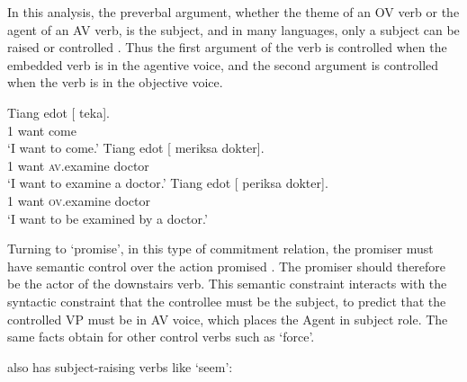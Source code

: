 \documentclass[output=paper
	        ,collection
	        ,collectionchapter
 	        ,biblatex
                ,babelshorthands
                ,newtxmath
                ,draftmode
                ,colorlinks, citecolor=brown
]{langscibook}
\begin{document}
In this analysis, the preverbal argument, whether the theme of an OV verb or the agent of an AV verb, is the subject, and in many languages, only a subject
can be raised or controlled \citep{Zaenenetal1985}. Thus the first argument of the verb is controlled when the embedded verb is in the agentive voice, and the second argument is controlled when the verb is in the objective voice. 


\begin{exe}
\ex \begin{xlist}
\ex 
\gll Tiang edot [ \trace{} teka].\\
     1 want     {} {} come\\\hfill\citep[ex 25]{WechslerandArka1998}
\glt `I want to come.'
\ex 
\gll Tiang edot [ \trace{}  meriksa dokter].\\
     1     want {} {}     \textsc{av}.examine doctor\\
\glt `I want to examine a doctor.'
\ex 
\gll Tiang edot [ \trace{} periksa dokter].\\
     1     want {} {}    \textsc{ov}.examine doctor\\
\glt `I want to be examined by a doctor.'
\end{xlist}
\end{exe}

Turning to  `promise', in this type of commitment relation, the promiser must have semantic control over the action promised \citep{Farkas1988,Kroeger1993,SagandPollard1991}. The promiser should therefore be the actor of the downstairs verb. This semantic constraint interacts with the syntactic constraint that the controllee must be the subject, to predict that the controlled VP must be in AV voice, which places the Agent in subject role. The same facts obtain for other control verbs such as  `force'.

\eal
{}
\zl

 also has subject-raising verbs like  `seem':
\end{document}
